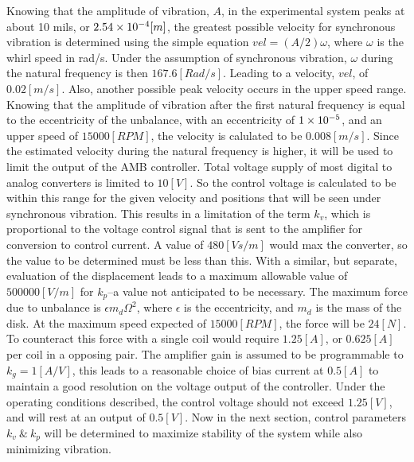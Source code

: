 Knowing that the amplitude of vibration, $ A $, in the experimental system peaks at about 10 mils, or $ 2.54\times 10^{-4}[m] $, the greatest possible velocity for synchronous vibration is determined using the simple equation $ vel=(A/2)\omega $, where $ \omega $ is the whirl speed in rad/s. Under the assumption of synchronous vibration, $ \omega $ during the natural frequency is then $ 167.6[Rad/s] $. Leading to a velocity, $ vel $, of $ 0.02[m/s] $. Also, another possible peak velocity occurs in the upper speed range. Knowing that the amplitude of vibration after the first natural frequency is equal to the eccentricity of the unbalance, with an eccentricity of $ 1\times 10^{-5} $, and an upper speed of $ 15000[RPM] $, the velocity is calulated to be $ 0.008[m/s] $. Since the estimated velocity during the natural frequency is higher, it will be used to limit the output of the AMB controller. Total voltage supply of most digital to analog converters is limited to $ 10[V] $. So the control voltage is calculated to be within this range for the given velocity and positions that will be seen under synchronous vibration. This results in a limitation of the term $ k_v $, which is proportional to the voltage control signal that is sent to the amplifier for conversion to control current. A value of $ 480[Vs/m] $ would max the converter, so the value to be determined must be less than this. With a similar, but separate, evaluation of the displacement leads to a maximum allowable value of $ 500000[V/m] $ for $ k_p $--a value not anticipated to be necessary. The maximum force due to unbalance is $ \epsilon m_d\Omega^2 $, where $ \epsilon $ is the eccentricity, and $ m_d $ is the mass of the disk. At the maximum speed expected of $ 15000[RPM] $, the force will be $ 24[N] $. To counteract this force with a single coil would require $ 1.25[A] $, or $ 0.625[A] $ per coil in a opposing pair. The amplifier gain is assumed to be programmable to $ k_g=1[A/V] $, this leads to a reasonable choice of bias current at $ 0.5[A] $ to maintain a good resolution on the voltage output of the controller. Under the operating conditions described, the control voltage should not exceed $ 1.25[V] $, and will rest at an output of $ 0.5[V] $. Now in the next section, control parameters $ k_v\ \&\ k_p $ will be determined to maximize stability of the system while also minimizing vibration.\par
